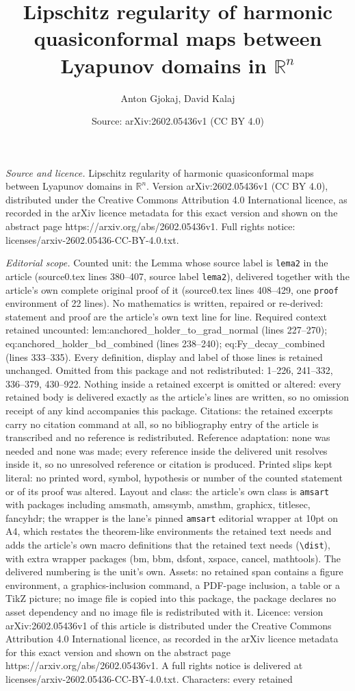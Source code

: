 \documentclass[10pt,a4paper]{amsart}
\title[Lipschitz regularity of harmonic quasiconformal maps between]{Lipschitz regularity of harmonic quasiconformal maps between Lyapunov domains in $\mathbb{R}^n$}
\author{Anton Gjokaj, David Kalaj}
\date{Source: arXiv:2602.05436v1 (CC BY 4.0)}
\begin{document}
\maketitle

\noindent\emph{Source and licence.} Lipschitz regularity of harmonic quasiconformal maps between Lyapunov domains in $\mathbb{R}^n$. Version arXiv:2602.05436v1 (CC BY 4.0), distributed under the Creative Commons Attribution 4.0 International licence, as recorded in the arXiv licence metadata for this exact version and shown on the abstract page https://arxiv.org/abs/2602.05436v1. Full rights notice: licenses/arxiv-2602.05436-CC-BY-4.0.txt.\par\smallskip

\noindent\textit{Editorial scope.} Counted unit: the Lemma whose source label is \texttt{lema2} in the article (source0.tex lines 380--407, source label \texttt{lema2}), delivered together with the article's own complete original proof of it (source0.tex lines 408--429, one \texttt{proof} environment of 22 lines). No mathematics is written, repaired or re-derived: statement and proof are the article's own text line for line. Required context retained uncounted: lem:anchored\_holder\_to\_grad\_normal (lines 227--270); eq:anchored\_holder\_bd\_combined (lines 238--240); eq:Fy\_decay\_combined (lines 333--335). Every definition, display and label of those lines is retained unchanged. Omitted from this package and not redistributed: 1--226, 241--332, 336--379, 430--922. Nothing inside a retained excerpt is omitted or altered: every retained body is delivered exactly as the article's lines are written, so no omission receipt of any kind accompanies this package. Citations: the retained excerpts carry no citation command at all, so no bibliography entry of the article is transcribed and no reference is redistributed. Reference adaptation: none was needed and none was made; every reference inside the delivered unit resolves inside it, so no unresolved reference or citation is produced. Printed slips kept literal: no printed word, symbol, hypothesis or number of the counted statement or of its proof was altered. Layout and class: the article's own class is \texttt{amsart} with packages including amsmath, amssymb, amsthm, graphicx, titlesec, fancyhdr; the wrapper is the lane's pinned \texttt{amsart} editorial wrapper at 10pt on A4, which restates the theorem-like environments the retained text needs and adds the article's own macro definitions that the retained text needs (\texttt{\textbackslash dist}), with extra wrapper packages (bm, bbm, dsfont, xspace, cancel, mathtools). The delivered numbering is the unit's own. Assets: no retained span contains a figure environment, a graphics-inclusion command, a PDF-page inclusion, a table or a TikZ picture; no image file is copied into this package, the package declares no asset dependency and no image file is redistributed with it. Licence: version arXiv:2602.05436v1 of this article is distributed under the Creative Commons Attribution 4.0 International licence, as recorded in the arXiv licence metadata for this exact version and shown on the abstract page https://arxiv.org/abs/2602.05436v1. A full rights notice is delivered at licenses/arxiv-2602.05436-CC-BY-4.0.txt. Characters: every retained 
\end{document}
